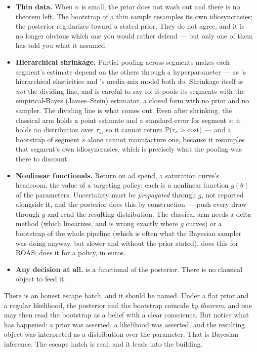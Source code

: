 \begin{itemize}[leftmargin=*]
  \item \textbf{Thin data.} When $n$ is small, the prior does not wash out and there is no theorem
        left. The bootstrap of a thin sample resamples its own idiosyncrasies; the posterior
        regularizes toward a stated prior. They do not agree, and it is no longer obvious which
        one you would rather defend --- but only one of them has told you what it assumed.
  \item \textbf{Hierarchical shrinkage.} Partial pooling across segments makes each segment's
        estimate depend on the others through a hyperparameter --- as 's hierarchical
        elasticities and 's media-mix model both do. Shrinkage itself is \emph{not} the
        dividing line, and  is careful to say so: it pools its segments with the
        empirical-Bayes (James--Stein) estimator, a closed form with no prior and no sampler. The
        dividing line is what comes out. Even after shrinking, the classical arm holds a point
        estimate and a standard error for segment $s$; it holds no distribution over $\tau_s$, so it
        cannot return $\operatorname{\mathbb{P}}(\tau_s > \text{cost})$ --- and a bootstrap of segment $s$ alone cannot
        manufacture one, because it resamples that segment's own idiosyncrasies, which is precisely
        what the pooling was there to discount.
  \item \textbf{Nonlinear functionals.} Return on ad spend, a saturation curve's headroom, the
        value of a targeting policy: each is a nonlinear function $g(\theta)$ of the parameters.
        Uncertainty must be \emph{propagated} through $g$, not reported alongside it, and the
        posterior does this by construction --- push every draw through $g$ and read the resulting
        distribution. The classical arm needs a delta method (which linearizes, and is wrong
        exactly where $g$ curves) or a bootstrap of the whole pipeline (which is often what the
        Bayesian sampler was doing anyway, but slower and without the prior stated).  does
        this for ROAS;  does it for a policy, in euros.
  \item \textbf{Any decision at all.}  is a functional of the posterior. There is
        no classical object to feed it.
\end{itemize}

\begin{remark}
There is an honest escape hatch, and it should be named. Under a flat prior and a regular
likelihood, the posterior and the bootstrap coincide \emph{by theorem}, and one may then read the
bootstrap as a belief with a clear conscience. But notice what has happened: a prior was asserted,
a likelihood was asserted, and the resulting object was interpreted as a distribution over the
parameter. That is Bayesian inference. The escape hatch is real, and it leads into the building.
\end{remark}

